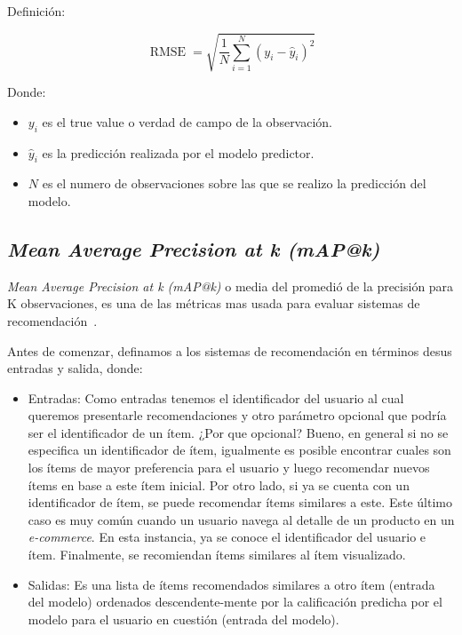 \documentclass[11pt,a4paper,twoside]{thesis}
\begin{document}
\begin{description}
	\item[Definición:]
\end{description}
\begin{equation}
	\operatorname{RMSE}=\sqrt{  \frac{1}{N} \sum_{i=1}^N (y_i - \hat y_i)^2}
\end{equation}
\begin{description}
	\item[Donde:]
\end{description}
\begin{itemize}
	\item $y_i$ es el true value o verdad de campo de la observación.
	\item $\hat y_i$ es la predicción realizada por el modelo predictor.
	\item $N$ es el numero de observaciones sobre las que se realizo la predicción del modelo.
\end{itemize}

\subsection{\textit{Mean Average Precision at k (mAP@k)}}
\label{sec:map_ref}

\textit{Mean Average Precision at k (mAP@k)} o media del promedió de la
precisión para K observaciones, es una de las métricas mas usada
para evaluar sistemas de recomendación~\cite{map_at_k_1, map_at_k_2, map_at_k_3}.

Antes de comenzar, definamos a los sistemas de recomendación en términos desus
entradas y salida, donde:

\begin{itemize}
	\item Entradas: Como entradas tenemos el identificador del usuario al cual queremos
	      presentarle recomendaciones y otro parámetro opcional que podría ser el
	      identificador de un ítem. ¿Por que opcional? Bueno, en general si no se
	      especifica un identificador de ítem, igualmente es posible encontrar cuales son
	      los ítems de mayor preferencia para el usuario y luego recomendar nuevos ítems
	      en base a este ítem inicial. Por otro lado, si ya se cuenta con un
	      identificador de ítem, se puede recomendar ítems similares a este. Este último
	      caso es muy común cuando un usuario navega al detalle de un producto en un
	      \textit{e-commerce}. En esta instancia, ya se conoce el identificador del
	      usuario e ítem. Finalmente, se recomiendan ítems similares al ítem visualizado.
	\item Salidas: Es una lista de ítems recomendados similares a otro ítem (entrada del
	      modelo) ordenados descendente-mente por la calificación predicha por el modelo
	      para el usuario en cuestión (entrada del modelo).
\end{itemize}
\end{document}
